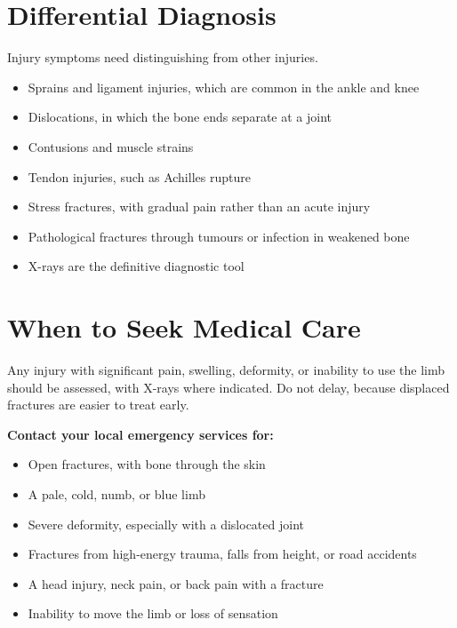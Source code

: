 \section*{Differential Diagnosis}
Injury symptoms need distinguishing from other injuries.
\begin{itemize}
    \item Sprains and ligament injuries, which are common in the ankle and knee
    \item Dislocations, in which the bone ends separate at a joint
    \item Contusions and muscle strains
    \item Tendon injuries, such as Achilles rupture
    \item Stress fractures, with gradual pain rather than an acute injury
    \item Pathological fractures through tumours or infection in weakened bone
    \item X-rays are the definitive diagnostic tool
\end{itemize}

\section*{When to Seek Medical Care}
Any injury with significant pain, swelling, deformity, or inability to use the limb should be assessed, with X-rays where indicated. Do not delay, because displaced fractures are easier to treat early.

\textbf{Contact your local emergency services for:}
\begin{itemize}
    \item Open fractures, with bone through the skin
    \item A pale, cold, numb, or blue limb
    \item Severe deformity, especially with a dislocated joint
    \item Fractures from high-energy trauma, falls from height, or road accidents
    \item A head injury, neck pain, or back pain with a fracture
    \item Inability to move the limb or loss of sensation
\end{itemize}

